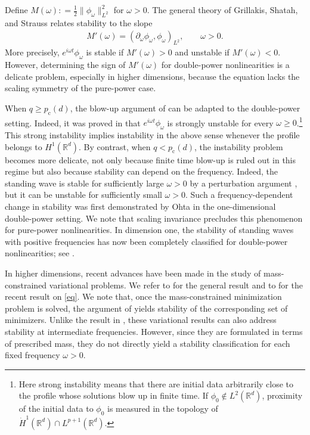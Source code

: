 \documentclass[12pt, a4paper, reqno]{amsart}
\numberwithin{equation}{section}
\theoremstyle{definition}
\theoremstyle{remark}
\newcommand{\R}{\mathbb R}
\def\rbra[#1,#2]{{\left( #1,#2\right)}}
\newcommand{\pt}{\partial}
\newcommand{\ce}{\mathrel{\mathop:}=}
\begin{document}
Define $M(\omega)\ce\frac12\|\phi_\omega\|_{L^2}^2$ for
$\omega>0$. The general theory of Grillakis, Shatah, and Strauss
\cite{GSS87} relates stability to the slope
\begin{align}
\label{Mprime}
  M'(\omega)
  =\rbra[\pt_\omega\phi_\omega,\phi_\omega]_{L^2},
  \qquad\omega>0.
\end{align}
More precisely, $e^{i\omega t}\phi_\omega$ is stable if
$M'(\omega)>0$ and unstable if $M'(\omega)<0$. 
However, determining the sign of $M'(\omega)$ for double-power nonlinearities is a delicate problem, especially in higher dimensions, because the equation lacks the scaling symmetry of the pure-power case.

When $q\ge p_{\mathrm c}(d)$, the blow-up argument of \cite{BC81} can be adapted to the double-power setting. Indeed, it was proved in \cite{FH21} that $e^{i\omega t}\phi_\omega$ is strongly unstable for every \mbox{$\omega\ge0$}.\footnote{Here strong instability means that there are initial data arbitrarily close to the profile whose solutions blow up in finite time. If $\phi_0\notin L^2(\R^d)$, proximity of the initial data to $\phi_0$ is measured in the topology of $\dot H^1(\R^d)\cap L^{p+1}(\R^d)$.}
This strong instability implies instability in the above
sense whenever the profile belongs to $H^1(\R^d)$.
By contrast, when $q<p_{\mathrm c}(d)$, the instability problem becomes more delicate, not only because finite time blow-up is ruled out in this regime but also because stability can depend on the frequency.
Indeed, the standing wave is stable for sufficiently large $\omega>0$ by a perturbation argument \cite{F03}, but it can be unstable for sufficiently small $\omega>0$. Such a frequency-dependent change in stability was first demonstrated by Ohta \cite{O95ko} in the one-dimensional double-power setting.
We note that scaling invariance precludes this phenomenon for pure-power nonlinearities. In dimension one, the stability of standing waves with positive frequencies has now been completely classified for double-power nonlinearities; see \cite{M08,KLT22}.

In higher dimensions, recent advances have been made in the study of mass-constrained variational problems. We refer to \cite{JL22cv} for the general result and to \cite{BFG25} for the recent result on \eqref{eq}.
We note that, once the mass-constrained minimization problem is solved, the argument of \cite{CL82} yields stability of the corresponding set of minimizers.
Unlike the result in \cite{F03}, these variational results can also address stability at intermediate frequencies. However, since they are formulated in terms of prescribed mass, they do not directly yield a stability classification for each fixed frequency $\omega>0$.
\end{document}
